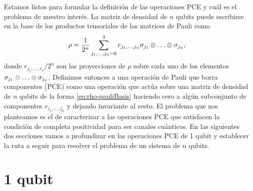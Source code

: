 Estamos listos para formular la definición de las operaciones PCE y 
cuál es el problema de nuestro interés. La matriz de densidad de $n$
qubits puede escribirse en la base de los productos tensoriales 
de las matrices de Pauli como
\begin{align}\label{eq:rho-pauliBasis}
\rho=\frac{1}{2^n}\sum_{j_1,\ldots,j_n=0}^3
r_{j_1,\ldots,j_n}\sigma_{j_1}\otimes \ldots\otimes \sigma_{j_n},
\end{align}
donde $r_{j_1,\ldots,r_n}/2^n$ son las proyecciones de $\rho$ sobre 
cada uno de los elementos $\sigma_{j_1}\otimes \ldots\otimes \sigma_{j_n}$. 
Definimos entonces a una operación de Pauli que borra componentes (PCE)  
como una operación que actúa sobre una matriz de densidad de $n$ qubits 
de la forma \eqref{eq:rho-pauliBasis} haciendo cero a algún subconjunto
de componentes $r_{j_1,\ldots,j_n}$ y dejando invariante al resto.
El problema que nos planteamos es el de caracterizar a las operaciones 
PCE que satisfacen la condición de completa positividad para ser 
canales cuánticos. En las siguientes dos secciones vamos a profundizar
en las operaciones PCE de 1 qubit y establecer la ruta a seguir para
resolver el problema de un sistema de $n$ qubits.


\section{1 qubit} %


